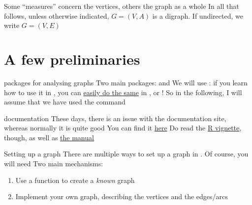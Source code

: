 \documentclass[aspectratio=169]{beamer}\usepackage[]{graphicx}\usepackage[]{xcolor}
\begin{document}
\begin{frame}
	Some ``measures'' concern the vertices, others the graph as a whole
	\vfill
	In all that follows, unless otherwise indicated, $G=(V,A)$ is a digraph. If undirected, we write $G=(V,E)$
\end{frame}


\section{A few  preliminaries}


\begin{frame}{ packages for analysing graphs}
	Two main packages: \href{https://cran.r-project.org/web/packages/network/index.html}{} and \href{https://r.igraph.org/}{}
	\vfill
	We will use : if you learn how to use it in , you can \href{https://igraph.org/index.html}{easily do the same} in ,  or  !
	\vfill
	So in the following, I will assume that we have used the command 
\end{frame}

\begin{frame}{ documentation}
	These days, there is an issue with the  documentation site, whereas normally it is quite good
	\vfill
	You can find it \href{https://igraph.org/r/doc/}{here}
	\vfill
	Do read the \href{https://cran.r-project.org/web/packages/igraph/vignettes/igraph.html}{R vignette}, though, as well as \href{https://cran.r-project.org/web/packages/igraph/igraph.pdf}{the manual}
\end{frame}

\begin{frame}{Setting up a graph}
	There are multiple ways to set up a graph in . Of course, you will need 
	\vfill
	Two main mechanisms:
	\begin{enumerate}
		\item Use a function to create a \emph{known} graph 
		\item Implement your own graph, describing the vertices and the edges/arcs
	\end{enumerate}
\end{frame}
\end{document}
